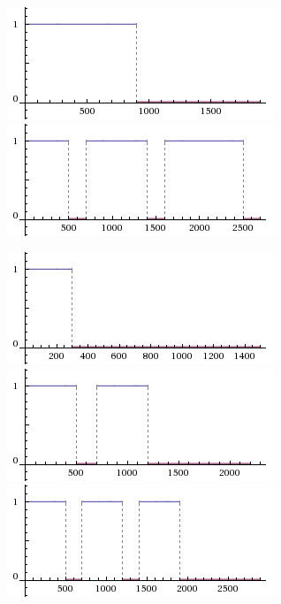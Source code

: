 \begin{slide}
  \begin{figure}[!h]
    \begin{center}
      \includegraphics[height=0.25\textheight]{img/graficaGiro.png}
      \includegraphics[height=0.25\textheight]{img/graficaDestino.png}
    \end{center}
  \end{figure}
  \begin{figure}[!h]
    \begin{center}
      \includegraphics[height=0.21\textheight]{img/graficaRotonda1.png}
      \includegraphics[height=0.21\textheight]{img/graficaRotonda2.png}
      \includegraphics[height=0.21\textheight]{img/graficaRotonda3.png}
    \end{center}
  \end{figure}
\end{slide}

